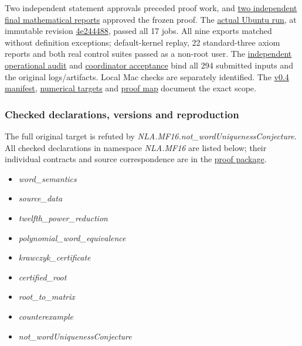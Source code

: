 \documentclass[11pt,a4paper]{article}
\providecommand{\tightlist}{\setlength{\itemsep}{0pt}\setlength{\parskip}{0pt}}
\begin{document}
Two independent statement approvals preceded proof work, and
\href{https://github.com/ajt60gaibb/OpenProblemsInNLA/blob/main/matrix-functions-and-stability/MF-16/lean/README.md\#review-and-checks-actually-performed}{two
independent final mathematical reports} approved the frozen proof. The
\href{https://github.com/sgstepaniants/OpenProblemsInNLA/actions/runs/34735259429}{actual
Ubuntu run}, at immutable revision
\href{https://github.com/sgstepaniants/OpenProblemsInNLA/tree/4e24448897a088ca9e7458379add1014c5d11e0c/matrix-functions-and-stability/MF-16/lean}{4e244488},
passed all 17 jobs. All nine exports matched without definition
exceptions; default-kernel replay, 22 standard-three axiom reports and
both real control suites passed as a non-root user. The
\href{https://github.com/ajt60gaibb/OpenProblemsInNLA/blob/main/matrix-functions-and-stability/MF-16/lean/verification/linux-2026-09-12/OPERATIONAL-REVIEW.md}{independent
operational audit} and
\href{https://github.com/ajt60gaibb/OpenProblemsInNLA/blob/main/matrix-functions-and-stability/MF-16/lean/verification/root-operational-2026-09-12/ROOT-CHECKS.json}{coordinator
acceptance} bind all 294 submitted inputs and the original
logs/artifacts. Local Mac checks are separately identified. The
\href{https://github.com/ajt60gaibb/OpenProblemsInNLA/blob/main/matrix-functions-and-stability/MF-16/lean/formalization.yaml}{v0.4
manifest},
\href{https://github.com/ajt60gaibb/OpenProblemsInNLA/blob/main/matrix-functions-and-stability/MF-16/lean/NUMERICAL_TARGETS.md}{numerical
targets} and
\href{https://github.com/ajt60gaibb/OpenProblemsInNLA/blob/main/matrix-functions-and-stability/MF-16/lean/verification/PROOF_MAP.md}{proof
map} document the exact scope.

\subsubsection{Checked declarations, versions and
reproduction}\label{checked-declarations-versions-and-reproduction}

The full original target is refuted by
\textit{NLA.MF16.not\_wordUniquenessConjecture}. All checked
declarations in namespace \textit{NLA.MF16} are listed below; their
individual contracts and source correspondence are in the
\href{https://github.com/ajt60gaibb/OpenProblemsInNLA/blob/main/matrix-functions-and-stability/MF-16/lean/README.md}{proof
package}.

\begin{itemize}
\tightlist
\item
  \textit{word\_semantics}
\item
  \textit{source\_data}
\item
  \textit{twelfth\_power\_reduction}
\item
  \textit{polynomial\_word\_equivalence}
\item
  \textit{krawczyk\_certificate}
\item
  \textit{certified\_root}
\item
  \textit{root\_to\_matrix}
\item
  \textit{counterexample}
\item
  \textit{not\_wordUniquenessConjecture}
\end{itemize}
\end{document}
